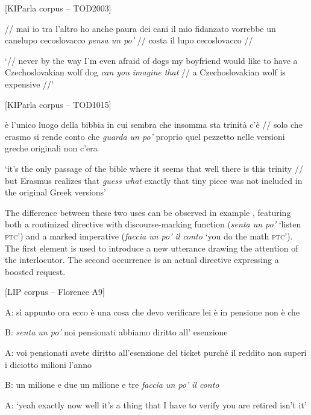 \ea%
    \label{ex:key:73}

          [KIParla corpus – TOD2003]

// mai io tra l’altro ho anche paura dei cani il mio fidanzato vorrebbe un canelupo cecoslovacco \textit{pensa un po’} // costa il lupo cecoslovacco //

\glt ‘// never by the way I’m even afraid of dogs my boyfriend would like to have a Czechoslovakian wolf dog \textit{can you imagine that} // a Czechoslovakian wolf is expensive //’
    \z %

\ea%
    \label{ex:key:74}

          [KIParla corpus – TOD1015]

è l’unico luogo della bibbia in cui sembra che insomma sta trinità c’è // solo che erasmo si rende conto che \textit{guarda un po’} proprio quel pezzetto nelle versioni greche originali non c’era

\glt ‘it’s the only passage of the bible where it seems that well there is this trinity // but Erasmus realizes that \textit{guess what} exactly that tiny piece was not included in the original Greek versions’
    \z %

The difference between these two uses can be observed in example , featuring both a routinized directive with discourse-marking function (\textit{senta un po’} ‘listen \textsc{ptc}’) and a marked imperative (\textit{faccia un po’ il conto} ‘you do the math \textsc{ptc}’). The first element is used to introduce a new utterance drawing the attention of the interlocutor. The second occurrence is an actual directive expressing a boosted request.

\ea%
    \label{ex:key:75}

          [LIP corpus – Florence A9]

A:  sì appunto ora ecco è una cosa che devo verificare lei è in pensione non è che

B:  \textit{senta un po’} noi pensionati abbiamo diritto all’ esenzione

A:   voi pensionati avete diritto all’esenzione del ticket purché il reddito non superi i diciotto milioni l’anno

B:   un milione e due un milione e tre \textit{faccia un po’}\textbf{ }\textit{il conto}

\glt
A:  ‘yeah exactly now well it’s a thing that I have to verify you are retired isn’t it’

